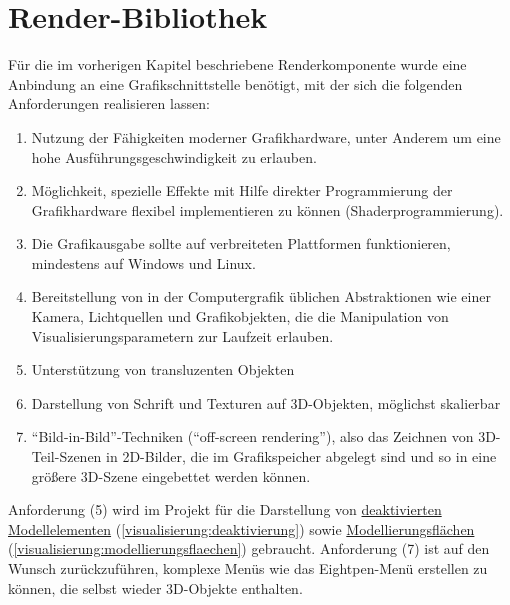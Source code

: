 \documentclass[a4paper,10pt]{sphinxmanual}
\begin{document}
\chapter{Render-Bibliothek}
\label{renderbib:render-bibliothek}\label{renderbib::doc}\label{renderbib:id1}
Für die im vorherigen Kapitel beschriebene Renderkomponente wurde eine Anbindung an eine Grafikschnittstelle benötigt, mit der sich die folgenden Anforderungen realisieren lassen:
\begin{enumerate}
\item {} 
Nutzung der Fähigkeiten moderner Grafikhardware, unter Anderem um eine hohe Ausführungsgeschwindigkeit zu erlauben.

\item {} 
Möglichkeit, spezielle Effekte mit Hilfe direkter Programmierung der Grafikhardware flexibel implementieren zu können (Shaderprogrammierung).

\item {} 
Die Grafikausgabe sollte auf verbreiteten Plattformen funktionieren, mindestens auf Windows und Linux.

\item {} 
Bereitstellung von in der Computergrafik üblichen Abstraktionen wie einer Kamera, Lichtquellen und Grafikobjekten, die die Manipulation von Visualisierungsparametern zur Laufzeit erlauben.

\item {} 
Unterstützung von transluzenten Objekten

\item {} 
Darstellung von Schrift und Texturen auf 3D-Objekten, möglichst skalierbar

\item {} 
"`Bild-in-Bild"'-Techniken ("`off-screen rendering"'), also das Zeichnen von 3D-Teil-Szenen in 2D-Bilder, die im Grafikspeicher abgelegt sind und so in eine größere 3D-Szene eingebettet werden können.

\end{enumerate}

Anforderung (5) wird im Projekt für die Darstellung von {\hyperref[visualisierung:deaktivierung]{deaktivierten Modellelementen}} (\autoref*{visualisierung:deaktivierung}) sowie {\hyperref[visualisierung:modellierungsflaechen]{Modellierungsflächen}} (\autoref*{visualisierung:modellierungsflaechen}) gebraucht.
Anforderung (7) ist auf den Wunsch zurückzuführen, komplexe Menüs wie das Eightpen-Menü \cite{buchi} erstellen zu können, die selbst wieder 3D-Objekte enthalten.
\end{document}
